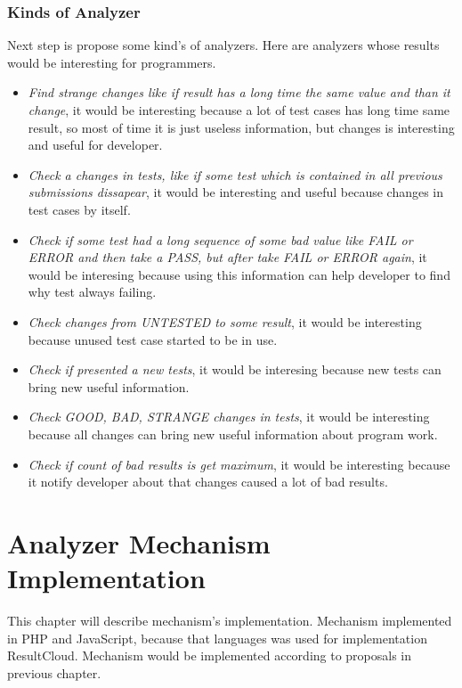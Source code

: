 \subsection{Kinds of Analyzer}

Next step is propose some kind's of analyzers. Here are analyzers whose results would be interesting for programmers.
\begin{itemize} 
\item \emph{Find strange changes like if result has a long time the same value and than it change}, it would be interesting because a lot of test cases has long time same result, so most of time it is just useless information, but changes is interesting and useful for developer.
\item \emph{Check a changes in tests, like if some test which is contained in all previous submissions dissapear}, it would be interesting and useful because changes in test cases by itself.
\item \emph{Check if some test had a long sequence of some bad value like FAIL or ERROR and then take a PASS, but after take FAIL or ERROR again}, it would be interesing because using this information can help developer to find why test always failing.
\item \emph{Check changes from UNTESTED to some result}, it would be interesting because unused test case started to be in use.
\item \emph{Check if presented a new tests}, it would be interesing because new tests can bring new useful information.
\item \emph{Check GOOD, BAD, STRANGE changes in tests}, it would be interesting because all changes can bring new useful information about program work. 
\item \emph{Check if count of bad results is get maximum}, it would be interesting because it notify developer about that changes caused a lot of bad results.
\end{itemize}

\chapter{Analyzer Mechanism Implementation}
\label{ch:analyzer_implement}

This chapter will describe mechanism's implementation. Mechanism implemented in PHP and JavaScript, because that languages was used for implementation ResultCloud. Mechanism would be implemented according to proposals in previous chapter.

